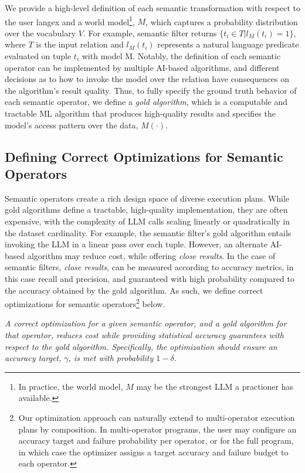 We provide a high-level definition of each semantic transformation with respect to the user langex and a world model\footnote{In practice, the world model, $M$ may be the strongest LLM a practioner has available.}, $M$, which captures a probability distribution over the vocabulary $V$. For example, semantic filter returns $\{t_i \in T | l_M(t_i) = 1\}$, where $T$ is the input relation and $l_M(t_i)$ represents a natural language predicate evaluated on tuple $t_i$ with model M. 
Notably, the definition of each semantic operator  can be implemented by multiple AI-based algorithms, and different decisions as to how to invoke the model over the relation have consequences on the algorithm's result quality. 
Thus, to fully specify the ground truth behavior of each semantic operator, we define a \emph{gold algorithm}, which is a computable and tractable ML algorithm that produces high-quality results and specifies the model's access pattern over the data, $M(\cdot)$. 



\subsection{Defining Correct Optimizations for Semantic Operators}
Semantic operators create a rich design space of diverse execution plans.
While gold algorithms define a tractable, high-quality implementation, they are often expensive, with the complexity of LLM calls scaling linearly or quadratically in the dataset cardinality. For example, the semantic filter's gold algorithm entails invoking the LLM in a linear pass over each tuple. However, an alternate AI-based algorithm may reduce cost, while offering \emph{close results}. In the case of semantic filters, \emph{close results}, can be measured according to accuracy metrics, in this case recall and precision, and guaranteed with high probability compared to the accuracy obtained by the gold algorithm. As such, we define correct optimizations for semantic operators\footnote{Our optimization approach can naturally extend to multi-operator execution plans by composition. In multi-operator programs, the user may configure an accuracy target and failure probability per operator, or for the full program, in which case the optimizer assigns a target accuracy and failure budget to each operator.} below.

 \emph{A correct optimization for a given semantic operator, and a gold algorithm for that operator, reduces cost while providing statistical accuracy guarantees with respect to the gold algorithm. Specifically, the optimization should ensure an accuracy target, $\gamma$, is met with probability $1-\delta$.}

